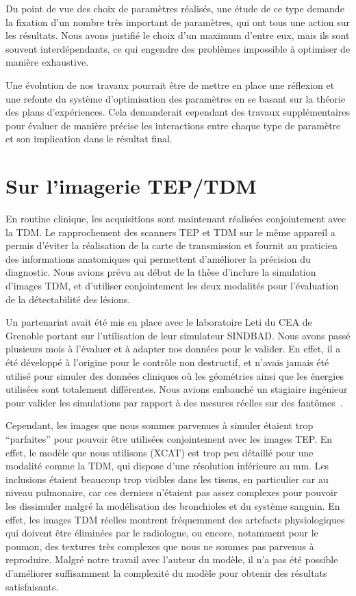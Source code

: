 Du point de vue des choix de paramètres réalisés, une étude de
ce type demande la fixation d'un nombre très important de
paramètres, qui ont tous une action sur les résultats. Nous avons justifié le
choix d'un maximum d'entre eux, mais ils sont souvent interdépendants, ce qui
engendre des problèmes impossible à optimiser de manière exhaustive.  

Une évolution de nos travaux pourrait être de mettre en place une réflexion et
une refonte du système d'optimisation des paramètres en se basant sur la théorie
des plans d'expériences. Cela demanderait cependant des travaux supplémentaires
pour évaluer de manière précise les interactions entre chaque type de paramètre
et son implication dans le résultat final. 


\section{Sur l'imagerie TEP/TDM}

En routine clinique, les acquisitions sont maintenant réalisées conjointement
avec la TDM. Le rapprochement des scanners TEP et TDM sur le même appareil a
permis d'éviter la réalisation de la carte de transmission et fournit au
praticien des informations anatomiques qui permettent d'améliorer la précision
du diagnostic. Nous avions prévu au début de la thèse d'inclure la simulation
d'images TDM, et d'utiliser conjointement les deux modalités pour l'évaluation
de la détectabilité des lésions.  

Un partenariat avait été mis en place avec le laboratoire Leti du CEA de
Grenoble portant sur l'utilisation de leur simulateur SINDBAD. Nous avons passé
plusieurs mois à l'évaluer et à adapter nos données pour le valider. En effet,
il a été développé à l'origine pour le contrôle non destructif, et n'avais
jamais été utilisé pour simuler des données cliniques où les géométries ainsi
que les énergies utilisées sont totalement différentes. Nous avions embauché un
stagiaire ingénieur pour valider les simulations par rapport à des mesures
réelles sur des fantômes~\cite{leduvehat}.  

Cependant, les images que nous sommes parvenues à simuler étaient trop
``parfaites'' pour pouvoir être utilisées conjointement avec les images TEP. En
effet, le modèle que nous utilisons (XCAT) est trop peu détaillé pour une
modalité comme la TDM, qui dispose d'une résolution inférieure au mm. Les
inclusions étaient beaucoup trop visibles dans les tissus, en particulier car
au niveau pulmonaire, car ces derniers n'étaient pas assez complexes pour
pouvoir les dissimuler malgré la modélisation des bronchioles et du système
sanguin. En effet, les images TDM réelles montrent fréquemment des artefacts
physiologiques qui doivent être éliminées par le radiologue, ou encore,
notamment pour le poumon, des textures très complexes que nous ne sommes pas
parvenus à reproduire. Malgré notre travail avec l'auteur du modèle, il n'a pas
été possible d'améliorer suffisamment la complexité du modèle pour obtenir des
résultats satisfaisants. 

